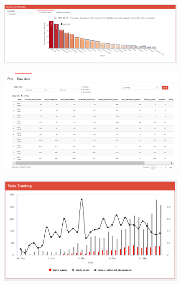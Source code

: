 \documentclass[
12pt, %
a4paper, %
oneside, %
headinclude,footinclude, %
BCOR5mm, %
]{scrartcl}
\begin{document}
\begin{figure}[H]
  \centering
\begin{subfigure}{.8\textwidth}
  \centering
  \includegraphics[width=1\linewidth]{Figures/Inspection_perc_occupancy.png}
  \caption{}
  \label{fig:Inspection_perc_occupancy}
\end{subfigure} 
\begin{subfigure}{.8\textwidth}
  \centering
  \includegraphics[width=1\linewidth]{Figures/Inspection_rawdata.png} 
  \caption{}
  \label{fig:Inspection_rawdata}
\end{subfigure} 
\begin{subfigure}{.8\textwidth}
  \centering
  \includegraphics[width=1\linewidth]{Figures/Inspection_test_tracking.png} 

\end{subfigure}
\end{figure}
\end{document}
